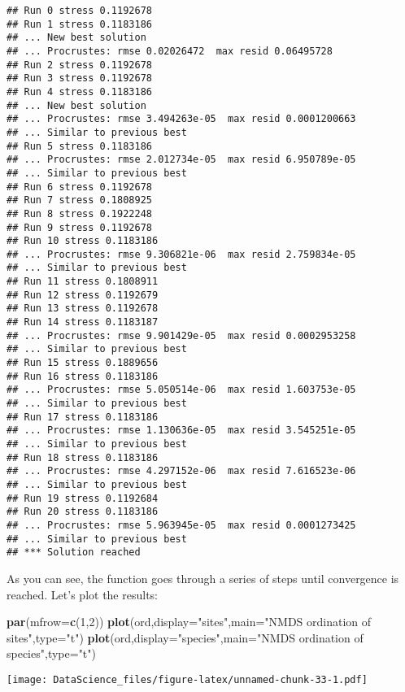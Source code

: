 \documentclass[
]{book}
\newenvironment{Shaded}{\begin{snugshade}}{\end{snugshade}}
\newcommand{\DataTypeTok}[1]{\textcolor[rgb]{0.13,0.29,0.53}{#1}}
\newcommand{\DecValTok}[1]{\textcolor[rgb]{0.00,0.00,0.81}{#1}}
\newcommand{\KeywordTok}[1]{\textcolor[rgb]{0.13,0.29,0.53}{\textbf{#1}}}
\newcommand{\NormalTok}[1]{#1}
\newcommand{\StringTok}[1]{\textcolor[rgb]{0.31,0.60,0.02}{#1}}
\begin{document}
\begin{verbatim}
## Run 0 stress 0.1192678 
## Run 1 stress 0.1183186 
## ... New best solution
## ... Procrustes: rmse 0.02026472  max resid 0.06495728 
## Run 2 stress 0.1192678 
## Run 3 stress 0.1192678 
## Run 4 stress 0.1183186 
## ... New best solution
## ... Procrustes: rmse 3.494263e-05  max resid 0.0001200663 
## ... Similar to previous best
## Run 5 stress 0.1183186 
## ... Procrustes: rmse 2.012734e-05  max resid 6.950789e-05 
## ... Similar to previous best
## Run 6 stress 0.1192678 
## Run 7 stress 0.1808925 
## Run 8 stress 0.1922248 
## Run 9 stress 0.1192678 
## Run 10 stress 0.1183186 
## ... Procrustes: rmse 9.306821e-06  max resid 2.759834e-05 
## ... Similar to previous best
## Run 11 stress 0.1808911 
## Run 12 stress 0.1192679 
## Run 13 stress 0.1192678 
## Run 14 stress 0.1183187 
## ... Procrustes: rmse 9.901429e-05  max resid 0.0002953258 
## ... Similar to previous best
## Run 15 stress 0.1889656 
## Run 16 stress 0.1183186 
## ... Procrustes: rmse 5.050514e-06  max resid 1.603753e-05 
## ... Similar to previous best
## Run 17 stress 0.1183186 
## ... Procrustes: rmse 1.130636e-05  max resid 3.545251e-05 
## ... Similar to previous best
## Run 18 stress 0.1183186 
## ... Procrustes: rmse 4.297152e-06  max resid 7.616523e-06 
## ... Similar to previous best
## Run 19 stress 0.1192684 
## Run 20 stress 0.1183186 
## ... Procrustes: rmse 5.963945e-05  max resid 0.0001273425 
## ... Similar to previous best
## *** Solution reached
\end{verbatim}

As you can see, the function goes through a series of steps until convergence is reached. Let's plot the results:

\begin{Shaded}
\begin{Highlighting}[]
\KeywordTok{par}\NormalTok{(}\DataTypeTok{mfrow=}\KeywordTok{c}\NormalTok{(}\DecValTok{1}\NormalTok{,}\DecValTok{2}\NormalTok{))}
\KeywordTok{plot}\NormalTok{(ord,}\DataTypeTok{display=}\StringTok{"sites"}\NormalTok{,}\DataTypeTok{main=}\StringTok{"NMDS ordination of sites"}\NormalTok{,}\DataTypeTok{type=}\StringTok{"t"}\NormalTok{)}
\KeywordTok{plot}\NormalTok{(ord,}\DataTypeTok{display=}\StringTok{"species"}\NormalTok{,}\DataTypeTok{main=}\StringTok{"NMDS ordination of species"}\NormalTok{,}\DataTypeTok{type=}\StringTok{"t"}\NormalTok{)}
\end{Highlighting}
\end{Shaded}

\texttt{[image: DataScience\_files/figure-latex/unnamed-chunk-33-1.pdf]}
\end{document}
